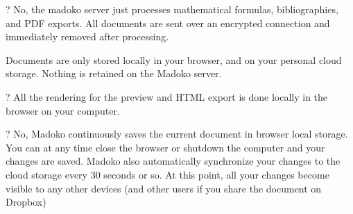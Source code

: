 \documentclass{book}
\begin{document}
\begin{mdOl}[class={loose},data-line={74}]%
\begin{mdLi}[data-line={74}]%
\begin{mdP}[data-line={74}]%
{}%
{}?%
{}\mdBr
{} No, the madoko server just processes mathematical formulas,
 bibliographies, and PDF exports. All documents are sent over an
 encrypted connection and immediately removed after processing.%
\end{mdP}%
\begin{mdP}[data-line={79}]%
{} Documents are only stored locally in your browser, and on your
 personal cloud storage. Nothing is retained on the Madoko server.%
\end{mdP}%
\end{mdLi}%
\begin{mdLi}[data-line={82}]%
\begin{mdP}[data-line={82}]%
{}%
{}?%
{}\mdBr
{} All the rendering for the preview and HTML export is done locally
 in the browser on your computer.%
\end{mdP}%
\begin{mdPre}[class={para-block,pre-indented},data-line={86}]%
\mdPrecode{}%
\end{mdPre}%
\end{mdLi}%
\begin{mdLi}[data-line={86}]%
\begin{mdP}[data-line={86}]%
{}%
{}?%
{}\mdBr
{} No, Madoko continuously saves the current document in browser local
 storage. You can at any time close the browser or shutdown the
 computer and your changes are saved. Madoko also automatically
 synchronize your changes to the cloud storage every 30 seconds or
 so. At this point, all your changes become visible to any other
 devices (and other users if you share the document on Dropbox)%
\end{mdP}%
\begin{mdP}[data-line={94}]%

\end{mdP}
\end{mdLi}
\end{mdOl}
\end{document}
